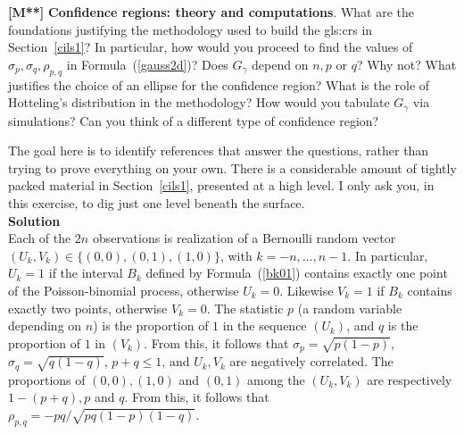 \documentclass[10pt]{article}
\begin{document}
\begin{Exercise}\label{exhotelling}{\bf [M**]}
{\bf Confidence regions: theory and computations}.  What are the foundations justifying the methodology used to build the
\glspl{gls:cr}
in Section~\ref{cils1}? In particular, how would you proceed to find the values of $\sigma_p,\sigma_q,\rho_{p,q}$ in Formula~(\ref{gauss2d})? Does $G_\gamma$ depend
on $n, p$ or $q$? Why not? What justifies the choice of an ellipse for the confidence region? What is the role of
\textcolor{index}{Hotteling's distribution} in the methodology? How would you tabulate $G_\gamma$ via
simulations? Can you think of a different type of confidence region?

The goal here is to identify references that answer the questions, rather than trying to prove everything on your own. There is a considerable amount of tightly packed material in Section~\ref{cils1}, presented at a high level. I only ask you, in this exercise, to dig  just one level beneath the surface. \vspace{1ex} \\
{\bf Solution} \vspace{1ex} \\
Each of the $2n$ observations is  realization of a Bernoulli random vector
$(U_k, V_k)\in \{(0,0), (0,1), (1,0)\}$, with $k=-n,\dots,n-1$.  In particular, $U_k=1$ if the interval $B_k$ defined by Formula~(\ref{bk01}) contains exactly one point of the Poisson-binomial process, otherwise $U_k=0$.
Likewise $V_k=1$ if $B_k$ contains exactly two points, otherwise $V_k=0$. The statistic $p$ (a random variable depending on $n$) is the proportion of $1$ in the sequence $(U_k)$, and $q$ is the proportion
of $1$ in $(V_k)$. From this, it follows that $\sigma_p=\sqrt{p(1-p)}$, $\sigma_q=\sqrt{q(1-q)}$, $p+q\leq 1$, and $U_k,V_k$ are negatively correlated. The proportions of $(0,0), (1,0)$
and $(0,1)$ among the $(U_k,V_k)$ are respectively
$1-(p+q), p$ and $q$. From this, it follows that $\rho_{p,q}=-pq/\sqrt{pq(1-p)(1-q)}$.


\end{Exercise}
\end{document}
